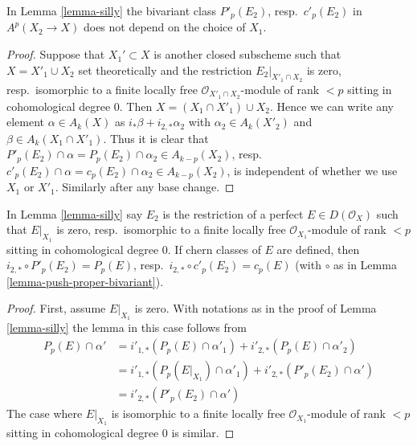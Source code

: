 \begin{lemma}
\label{lemma-silly-independent}
In Lemma \ref{lemma-silly} the bivariant class
$P'_p(E_2)$, resp.\ $c'_p(E_2)$ in $A^p(X_2 \to X)$
does not depend on the choice of $X_1$.
\end{lemma}

\begin{proof}
Suppose that $X_1' \subset X$ is another closed subscheme such that
$X = X'_1 \cup X_2$ set theoretically and the restriction
$E_2|_{X'_1 \cap X_2}$ is zero, resp.\ isomorphic to a
finite locally free $\mathcal{O}_{X'_1 \cap X_2}$-module
of rank $< p$ sitting in cohomological degree $0$.
Then $X = (X_1 \cap X'_1) \cup X_2$. Hence we can write
any element $\alpha \in A_k(X)$ as $i_*\beta + i_{2, *}\alpha_2$ with
$\alpha_2 \in A_k(X'_2)$ and $\beta \in A_k(X_1 \cap X'_1)$.
Thus it is clear that
$P'_p(E_2) \cap \alpha = P_p(E_2) \cap \alpha_2 \in A_{k - p}(X_2)$,
resp.\  $c'_p(E_2) \cap \alpha = c_p(E_2) \cap \alpha_2 \in A_{k - p}(X_2)$,
is independent of whether we use $X_1$ or $X'_1$. Similarly
after any base change.
\end{proof}

\begin{lemma}
\label{lemma-silly-silly}
In Lemma \ref{lemma-silly} say $E_2$ is the restriction of a
perfect $E \in D(\mathcal{O}_X)$ such that $E|_{X_1}$ is zero,
resp.\ isomorphic to a finite locally free $\mathcal{O}_{X_1}$-module
of rank $< p$ sitting in cohomological degree $0$.
If chern classes of $E$ are defined, then
$i_{2, *} \circ P'_p(E_2) = P_p(E)$,
resp.\ $i_{2, *} \circ c'_p(E_2) = c_p(E)$
(with $\circ$ as in Lemma \ref{lemma-push-proper-bivariant}).
\end{lemma}

\begin{proof}
First, assume $E|_{X_1}$ is zero.
With notations as in the proof of Lemma \ref{lemma-silly}
the lemma in this case follows from
\begin{align*}
P_p(E) \cap \alpha'
& =
i'_{1, *}(P_p(E) \cap \alpha'_1) +
i'_{2, *}(P_p(E) \cap \alpha'_2) \\
& =
i'_{1, *}(P_p(E|_{X_1}) \cap \alpha'_1) +
i'_{2, *}(P'_p(E_2) \cap \alpha') \\
& =
i'_{2, *}(P'_p(E_2) \cap \alpha')
\end{align*}
The case where $E|_{X_1}$ is isomorphic to a finite locally free
$\mathcal{O}_{X_1}$-module of rank $< p$ sitting in cohomological degree $0$
is similar.
\end{proof}

